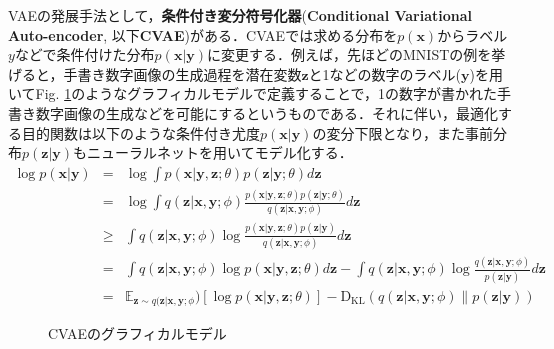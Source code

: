 VAEの発展手法として，{\bf 条件付き変分符号化器}({\bf Conditional Variational Auto-encoder}, 以下{\bf CVAE})\cite{Sohn2015}がある．CVAEでは求める分布を$p(\bm{x})$からラベル$y$などで条件付けた分布$p(\bm{x}|\bm{y})$に変更する．例えば，先ほどのMNISTの例を挙げると，手書き数字画像の生成過程を潜在変数$\bm{z}$と1などの数字のラベル($\bm{y}$)を用いてFig. \ref{fig:gm_cvae}のようなグラフィカルモデルで定義することで，1の数字が書かれた手書き数字画像の生成などを可能にするというものである．それに伴い，最適化する目的関数は以下のような条件付き尤度$p(\bm{x}|\bm{y})$の変分下限となり，また事前分布$p(\bm{z}|\bm{y})$もニューラルネットを用いてモデル化する．
\begin{eqnarray}
\log p(\bm{x}|\bm{y}) &=& \log \int p(\bm{x}|\bm{y},\bm{z}; \theta) p(\bm{z}|\bm{y}; \theta) d\bm{z} \nonumber \\
&=& \log \int q(\bm{z}|\bm{x}, \bm{y}; \phi) \frac{p(\bm{x}|\bm{y}, \bm{z}; \theta) p(\bm{z}|\bm{y}; \theta)}{q(\bm{z}|\bm{x}, \bm{y}; \phi)} d\bm{z} \nonumber \\
&\geq& \int q(\bm{z}|\bm{x}, \bm{y}; \phi) \log \frac{p(\bm{x}|\bm{y}, \bm{z}; \theta) p(\bm{z}|\bm{y})}{q(\bm{z}|\bm{x}, \bm{y}; \phi)} d\bm{z} \nonumber \\
&=& \int q(\bm{z}|\bm{x}, \bm{y}; \phi) \log p(\bm{x}|\bm{y}, \bm{z}; \theta) d\bm{z} - \int q(\bm{z}|\bm{x}, \bm{y}; \phi) \log \frac{q(\bm{z}|\bm{x}, \bm{y}; \phi)}{p(\bm{z}|\bm{y})} d\bm{z} \nonumber \\
&=& \mathbb{E}_{\bm{z} \sim q(\bm{z}|\bm{x}, \bm{y}; \phi}) [\log p(\bm{x}|\bm{y}, \bm{z}; \theta)] - \mathrm{D_{KL}}(q(\bm{z}|\bm{x}, \bm{y}; \phi) \| p(\bm{z}|\bm{y})) \label{eq:celbo}
\end{eqnarray}

\begin{figure}[tbp]
\begin{center}
\caption{CVAEのグラフィカルモデル}
\label{fig:gm_cvae}
\end{center}
\end{figure}

